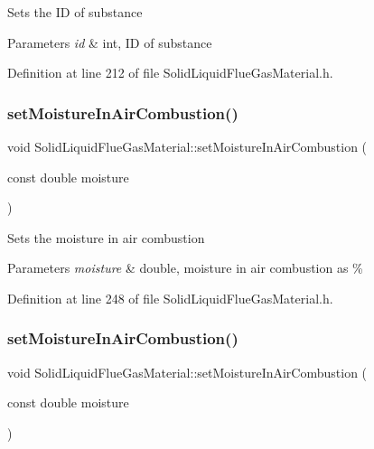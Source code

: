 Sets the ID of substance 
\begin{DoxyParams}{Parameters}
{\em id} & int, ID of substance \\
\hline
\end{DoxyParams}


Definition at line 212 of file Solid\+Liquid\+Flue\+Gas\+Material.\+h.

\mbox{\label{class_solid_liquid_flue_gas_material_a1a5f1bd3008e78cce62edb8aca642284}} 
\subsubsection{\texorpdfstring{set\+Moisture\+In\+Air\+Combustion()}{setMoistureInAirCombustion()}\hspace{0.1cm}{\footnotesize\ttfamily [1/3]}}
{\footnotesize\ttfamily void Solid\+Liquid\+Flue\+Gas\+Material\+::set\+Moisture\+In\+Air\+Combustion (\begin{DoxyParamCaption}\item[{const double}]{moisture }\end{DoxyParamCaption})\hspace{0.3cm}{\ttfamily [inline]}}

Sets the moisture in air combustion 
\begin{DoxyParams}{Parameters}
{\em moisture} & double, moisture in air combustion as \% \\
\hline
\end{DoxyParams}


Definition at line 248 of file Solid\+Liquid\+Flue\+Gas\+Material.\+h.

\mbox{\label{class_solid_liquid_flue_gas_material_a1a5f1bd3008e78cce62edb8aca642284}} 
\subsubsection{\texorpdfstring{set\+Moisture\+In\+Air\+Combustion()}{setMoistureInAirCombustion()}\hspace{0.1cm}{\footnotesize\ttfamily [2/3]}}
{\footnotesize\ttfamily void Solid\+Liquid\+Flue\+Gas\+Material\+::set\+Moisture\+In\+Air\+Combustion (\begin{DoxyParamCaption}\item[{const double}]{moisture }\end{DoxyParamCaption})\hspace{0.3cm}{\ttfamily [inline]}}

